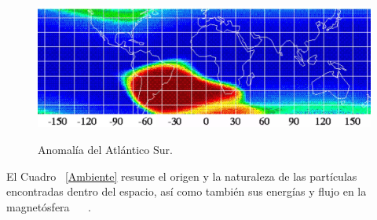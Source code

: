 \documentclass[a4paper,openright,12pt]{report}
\begin{document}
\begin{figure}[H]
	\centering
	\includegraphics[width=1 \textwidth]{img/anomalia.jpg}
	\caption{Anomalía del Atlántico Sur. }\cite{NASA3}
	\label{anomalia}
\end{figure}



El Cuadro  ~\ref{Ambiente} resume el origen y la naturaleza de las partículas encontradas dentro del espacio, así como también sus energías y  flujo en la magnetósfera ~\cite{boudenot1995}  ~\cite{la1995latchup}.
\end{document}
